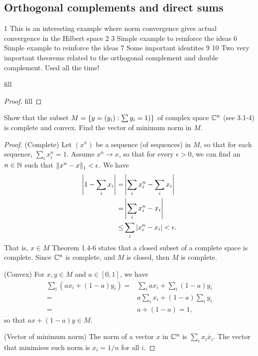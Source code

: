 \subsection{Orthogonal complements and direct sums}

1 This is an interesting example where norm convergence gives actual convergence in the Hilbert space
2
3 Simple example to reinforce the ideas
6 Simple example to reinforce the ideas
7 Some important identites
9
10 Two very important theorems related to the orthogonal complement and double complement. Used all the time!

\begin{exercise}{1}
fill
\end{exercise}
\begin{proof}
fill
\end{proof}

\begin{exercise}{2}
Show that the subset $M=\{y=(y_i): \sum y_i=1)\}$ of complex space $\mathbb{C}^n$ (see 3.1-4) is complete and convex.
Find the vector of minimum norm in $M$.
\end{exercise}
\begin{proof}
(Complete)
Let $(x^n)$ be a sequence (of sequences) in $M$, so that for each sequence, $\sum_i x^n_i=1$.
Assume $x^n\to x$, so that for every $\epsilon>0$, we can find an $n\in\mathbb{N}$ such that $\left\lVert x^n-x\right\rVert_1<\epsilon$.
We have
\begin{align*}
    \left\lvert 1-\sum_i x_i\right\rvert
    =& \left\lvert \sum_i x^n_i - \sum_i x_i\right\rvert\\
    =& \left\lvert \sum_i x^n_i - x_i\right\rvert\\
    \leq& \sum_i\left\lvert x^n_i - x_i\right\rvert
    <\epsilon.
\end{align*}
That is, $x\in M$
Theorem 1.4-6 states that a closed subset of a complete space is complete.
Since $\mathbb{C}^n$ is complete, and $M$ is closed, then $M$ is complete.

(Convex)
For $x,y\in M$ and $a\in[0,1]$, we have
\begin{align*}
    \sum_i (ax_i+(1-a)y_i)
    =& \sum_i ax_i + \sum_i (1-a)y_i\\
    =& a\sum_i x_i + (1-a)\sum_i y_i\\
    =& a + (1-a) = 1,
\end{align*}
so that $ax+(1-a)y\in M$.

(Vector of minimum norm)
The norm of a vector $x$ in $\mathbb{C}^n$ is $\sum_i x_i\bar{x}_i$.
The vector that minimises such norm is $x_i=1/n$ for all $i$.
\end{proof}

